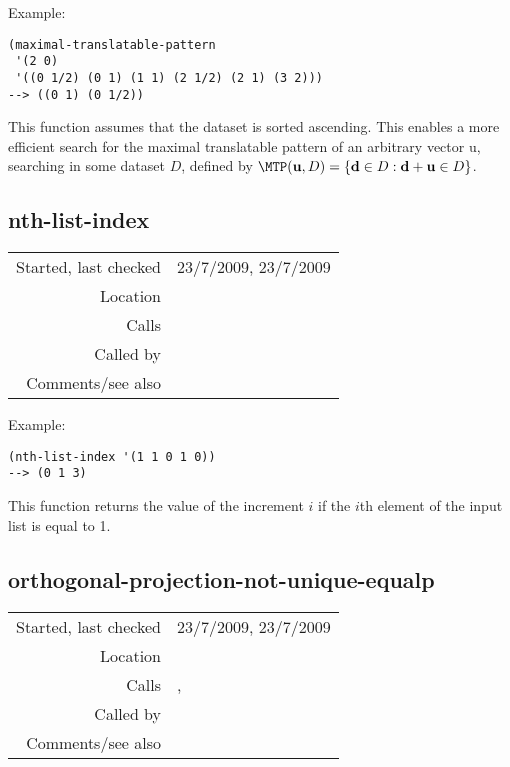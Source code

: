 \vspace{0.5cm}
\noindent Example:
\begin{verbatim}
(maximal-translatable-pattern
 '(2 0)
 '((0 1/2) (0 1) (1 1) (2 1/2) (2 1) (3 2)))
--> ((0 1) (0 1/2))
\end{verbatim}

\noindent This function assumes that the dataset is
sorted ascending. This enables a more efficient search
for the maximal translatable pattern of an arbitrary
vector u, searching in some dataset $D$, defined by
$\MTP(\mathbf{u}, D) = \{ \mathbf{d} \in D :
\mathbf{d} + \mathbf{u} \in D \}$.


\subsection*{nth-list-index}\label{fun:nth-list-index}

\vspace{0.3cm}
\begin{tabular}{r|p{8cm}}
Started, last checked & 23/7/2009, 23/7/2009 \\
Location & \nameref{sec:projection} \\
Calls & \\
Called by & \nameref{fun:orthogonal-projection-not-unique-equalp} \\
Comments/see also &
\end{tabular}

\vspace{0.5cm}
\noindent Example:
\begin{verbatim}
(nth-list-index '(1 1 0 1 0))
--> (0 1 3)
\end{verbatim}

\noindent This function returns the value of the
increment $i$ if the $i$th element of the input list
is equal to 1.


\subsection*{orthogonal-projection-not-unique-equalp}\label{fun:orthogonal-projection-not-unique-equalp}

\vspace{0.3cm}
\begin{tabular}{r|p{8cm}}
Started, last checked & 23/7/2009, 23/7/2009 \\
Location & \nameref{sec:projection} \\
Calls & \nameref{fun:nth-list}, \nameref{fun:nth-list-index} \\
Called by & \nameref{fun:orthogonal-projection-unique-equalp} \\
Comments/see also &
\end{tabular}

